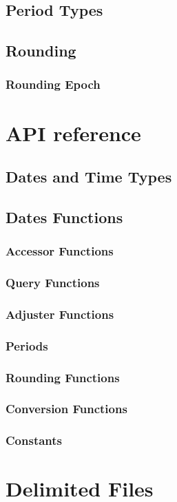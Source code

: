     \section{Period Types}
    \section{Rounding}
    \subsection{Rounding Epoch}
  \chapter{API reference}
    \section{Dates and Time Types}
    \section{Dates Functions}
    \subsection{Accessor Functions}
    \subsection{Query Functions}
    \subsection{Adjuster Functions}
    \subsection{Periods}
    \subsection{Rounding Functions}
    \subsection{Conversion Functions}
    \subsection{Constants}
  \chapter{Delimited Files}
